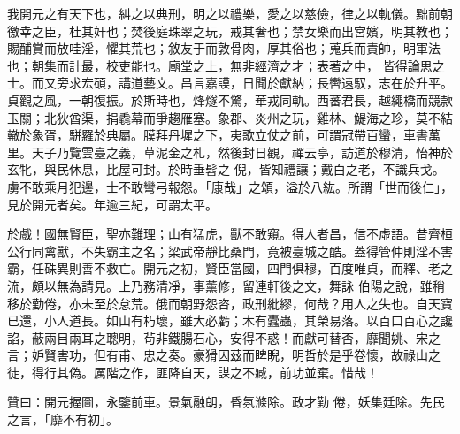 \begin{pinyinscope}
 我開元之有天下也，糾之以典刑，明之以禮樂，愛之以慈儉，律之以軌儀。黜前朝徼幸之臣，杜其奸也；焚後庭珠翠之玩，戒其奢也；禁女樂而出宮嬪，明其教也；賜酺賞而放哇淫，懼其荒也；敘友于而敦骨肉，厚其俗也；蒐兵而責帥，明軍法也；朝集而計最，校吏能也。廟堂之上，無非經濟之才；表著之中，
 皆得論思之士。而又旁求宏碩，講道藝文。昌言嘉謨，日聞於獻納；長轡遠馭，志在於升平。貞觀之風，一朝復振。於斯時也，烽燧不驚，華戎同軌。西蕃君長，越繩橋而競款玉關；北狄酋渠，捐毳幕而爭趨雁塞。象郡、炎州之玩，雞林、鯷海之珍，莫不結轍於象胥，駢羅於典屬。膜拜丹墀之下，夷歌立仗之前，可謂冠帶百蠻，車書萬里。天子乃覽雲臺之義，草泥金之札，然後封日觀，禪云亭，訪道於穆清，怡神於玄牝，與民休息，比屋可封。於時垂髫之
 倪，皆知禮讓；戴白之老，不識兵戈。虜不敢乘月犯邊，士不敢彎弓報怨。「康哉」之頌，溢於八紘。所謂「世而後仁」，見於開元者矣。年逾三紀，可謂太平。



 於戲！國無賢臣，聖亦難理；山有猛虎，獸不敢窺。得人者昌，信不虛語。昔齊桓公行同禽獸，不失霸主之名；梁武帝靜比桑門，竟被臺城之酷。蓋得管仲則淫不害霸，任硃異則善不救亡。開元之初，賢臣當國，四門俱穆，百度唯貞，而釋、老之流，頗以無為請見。上乃務清凈，事薰修，留連軒後之文，舞詠
 伯陽之說，雖稍移於勤倦，亦未至於怠荒。俄而朝野怨咨，政刑紕繆，何哉？用人之失也。自天寶已還，小人道長。如山有朽壞，雖大必虧；木有蠹蟲，其榮易落。以百口百心之讒諂，蔽兩目兩耳之聰明，茍非鐵腸石心，安得不惑！而獻可替否，靡聞姚、宋之言；妒賢害功，但有甫、忠之奏。豪猾因茲而睥睨，明哲於是乎卷懷，故祿山之徒，得行其偽。厲階之作，匪降自天，謀之不臧，前功並棄。惜哉！



 贊曰：開元握圖，永鑒前車。景氣融朗，昏氛滌除。政才勤
 倦，妖集廷除。先民之言，「靡不有初」。



\end{pinyinscope}